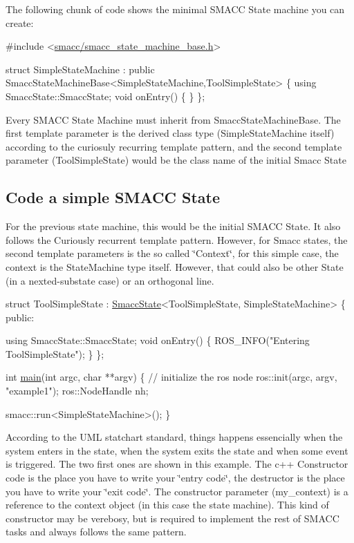 The following chunk of code shows the minimal S\+M\+A\+CC State machine you can create\+: 
\begin{DoxyCode}
\textcolor{preprocessor}{#include <\hyperlink{smacc__state__machine__base_8h}{smacc/smacc\_state\_machine\_base.h}>}

\textcolor{keyword}{struct }SimpleStateMachine
    : \textcolor{keyword}{public} SmaccStateMachineBase<SimpleStateMachine,ToolSimpleState>
\{
  \textcolor{keyword}{using} SmaccState::SmaccState;
  \textcolor{keywordtype}{void} onEntry()
  \{
  \}
\};
\end{DoxyCode}


Every S\+M\+A\+CC State Machine must inherit from Smacc\+State\+Machine\+Base. The first template parameter is the derived class type (Simple\+State\+Machine itself) according to the curiosuly recurring template pattern, and the second template parameter (Tool\+Simple\+State) would be the class name of the initial Smacc State

\subsection*{Code a simple S\+M\+A\+CC State}

For the previous state machine, this would be the initial S\+M\+A\+CC State. It also follows the Curiously recurrent template pattern. However, for Smacc states, the second template parameters is the so called \char`\"{}\+Context\char`\"{}, for this simple case, the context is the State\+Machine type itself. However, that could also be other State (in a nexted-\/substate case) or an orthogonal line.


\begin{DoxyCode}
\textcolor{keyword}{struct }ToolSimpleState
    : \hyperlink{classSmaccState}{SmaccState}<ToolSimpleState, SimpleStateMachine>
\{
\textcolor{keyword}{public}:

  \textcolor{keyword}{using} SmaccState::SmaccState;
  \textcolor{keywordtype}{void} onEntry()
  \{
    ROS\_INFO(\textcolor{stringliteral}{"Entering ToolSimpleState"});
  \}
\};

\textcolor{keywordtype}{int} \hyperlink{odom__tracker__node_8cpp_a3c04138a5bfe5d72780bb7e82a18e627}{main}(\textcolor{keywordtype}{int} argc, \textcolor{keywordtype}{char} **argv) \{
  \textcolor{comment}{// initialize the ros node}
  ros::init(argc, argv, \textcolor{stringliteral}{"example1"});
  ros::NodeHandle nh;

  smacc::run<SimpleStateMachine>();
\}
\end{DoxyCode}
 According to the U\+ML statchart standard, things happens essencially when the system enters in the state, when the system exits the state and when some event is triggered. The two first ones are shown in this example. The c++ Constructor code is the place you have to write your \char`\"{}entry code\char`\"{}, the destructor is the place you have to write your \char`\"{}exit code\char`\"{}. The constructor parameter (my\+\_\+context) is a reference to the context object (in this case the state machine). This kind of constructor may be verebosy, but is required to implement the rest of S\+M\+A\+CC tasks and always follows the same pattern.

